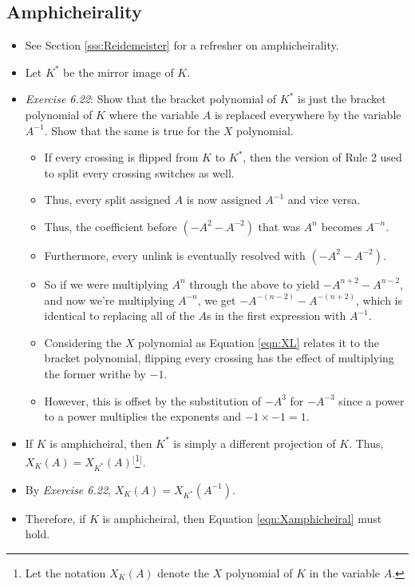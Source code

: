 \documentclass[titlepage]{article}
\numberwithin{figure}{section}
\numberwithin{table}{section}
\numberwithin{equation}{section}
\begin{document}
\subsection{Amphicheirality}\label{sss:Amphicheirality}
\begin{itemize}
    \item See Section \ref{sss:Reidemeister} for a refresher on amphicheirality.
    \item Let $K^{*}$ be the mirror image of $K$.
    \item \emph{Exercise 6.22}: Show that the bracket polynomial of $K^{*}$ is just the bracket polynomial of $K$ where the variable $A$ is replaced everywhere by the variable $A^{-1}$. Show that the same is true for the $X$ polynomial.
    \begin{itemize}
        \item If every crossing is flipped from $K$ to $K^{*}$, then the version of Rule 2 used to split every crossing switches as well.
        \item Thus, every split assigned $A$ is now assigned $A^{-1}$ and vice versa.
        \item Thus, the coefficient before $\left( -A^2-A^{-2} \right)$ that was $A^n$ becomes $A^{-n}$.
        \item Furthermore, every unlink is eventually resolved with $\left( -A^2-A^{-2} \right)$.
        \item So if we were multiplying $A^n$ through the above to yield $-A^{n+2}-A^{n-2}$, and now we're multiplying $A^{-n}$, we get $-A^{-(n-2)}-A^{-(n+2)}$, which is identical to replacing all of the $A$s in the first expression with $A^{-1}$.
        \item Considering the $X$ polynomial as Equation \ref{eqn:XL} relates it to the bracket polynomial, flipping every crossing has the effect of multiplying the former writhe by $-1$.
        \item However, this is offset by the substitution of $-A^3$ for $-A^{-3}$ since a power to a power multiplies the exponents and $-1\times -1=1$.
    \end{itemize}
    \item If $K$ is amphicheiral, then $K^{*}$ is simply a different projection of $K$. Thus, $X_K(A)=X_{K^{*}}(A)$$^[$\footnote{Let the notation $X_K(A)$ denote the $X$ polynomial of $K$ in the variable $A$.}$^]$.
    \item By \emph{Exercise 6.22}, $X_K(A)=X_{K^{*}}\left( A^{-1} \right)$.
    \item Therefore, if $K$ is amphicheiral, then Equation \ref{eqn:Xamphicheiral} must hold.
$$
\end{itemize}
\end{document}
